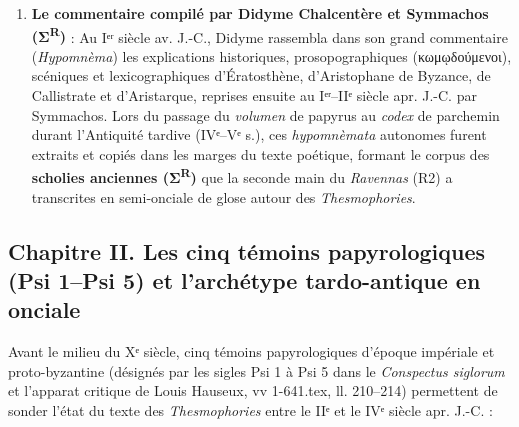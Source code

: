 \documentclass[11pt, a4paper, twoside]{article}
\renewcommand{\_}{\origunderscore\penalty0\relax}
\renewcommand{\texttt}[1]{#1}
\newcommand{\Rdeux}{\textbf{R}\textsuperscript{2}}
\newcommand{\PsiUn}{\textgreek{Ψ}\textsuperscript{1}}
\newcommand{\PsiCinq}{\textgreek{Ψ}\textsuperscript{5}}
\def\Rdeux{R2}%
\def\PsiUn{Psi 1}%
\def\PsiCinq{Psi 5}%
\begin{document}
\begin{enumerate}[leftmargin=1.6em, itemsep=2pt]
  \begin{itemize}[leftmargin=1.5em, itemsep=2pt]
    \item \textbf{Post v. 99 (\texttt{f. 163v}, l. 22)} : \texttt{μινυρισμός} (avec la scholie marginale explicite : \texttt{ἐν ἐνίοις δὲ καὶ μινυρισμὸς πρόσκειται· διὸ αὕτη παρεπιγράφεται}) ;
    \item \textbf{Post v. 129 (\texttt{f. 164r}, l. 10)} : \texttt{ὀλολύζει ὁ γέρων} ;
    \item \textbf{Post v. 276 (\texttt{f. 165v}, l. 20)} : \texttt{ὀλολύζουσι τε ἱερὸν ὠθεῖται} (avec \textit{korônis} à gauche et la scholie marginale explicite : \texttt{παρεπιγραφή. ἐκκυκλεῖται ἐπὶ τὸ ἔξω τὸ θεσμοφόριον}) ;
    \item \textbf{Post v. 1187 (\texttt{f. 176v}, l. 18)} : \texttt{ἀνακύπτη· καὶ παρακύπτι· ἀπεψωλημένος·}.
  \end{itemize}
  \item \textbf{Le commentaire compilé par Didyme Chalcentère et Symmachos (Σ\textsuperscript{R})} : Au Iᵉʳ siècle av. J.-C., Didyme rassembla dans son grand commentaire (\textit{Hypomnèma}) les explications historiques, prosopographiques (\texttt{κωμῳδούμενοι}), scéniques et lexicographiques d'Ératosthène, d'Aristophane de Byzance, de Callistrate et d'Aristarque, reprises ensuite au Iᵉʳ–IIᵉ siècle apr. J.-C. par Symmachos. Lors du passage du \textit{volumen} de papyrus au \textit{codex} de parchemin durant l'Antiquité tardive (IVᵉ–Vᵉ s.), ces \textit{hypomnèmata} autonomes furent extraits et copiés dans les marges du texte poétique, formant le corpus des \textbf{scholies anciennes (Σ\textsuperscript{R})} que la seconde main du \textit{Ravennas} (\Rdeux{}) a transcrites en semi-onciale de glose autour des \textit{Thesmophories}.
\end{enumerate}



\subsection{Chapitre II. Les cinq témoins papyrologiques (\PsiUn{}–\PsiCinq{}) et l'archétype tardo-antique en onciale}

Avant le milieu du Xᵉ siècle, cinq témoins papyrologiques d'époque impériale et proto-byzantine (désignés par les sigles \PsiUn{} à \PsiCinq{} dans le \textit{Conspectus siglorum} et l'apparat critique de Louis Hauseux, \texttt{vv 1-641.tex}, ll. 210–214) permettent de sonder l'état du texte des \textit{Thesmophories} entre le IIᵉ et le IVᵉ siècle apr. J.-C. :
\end{document}
